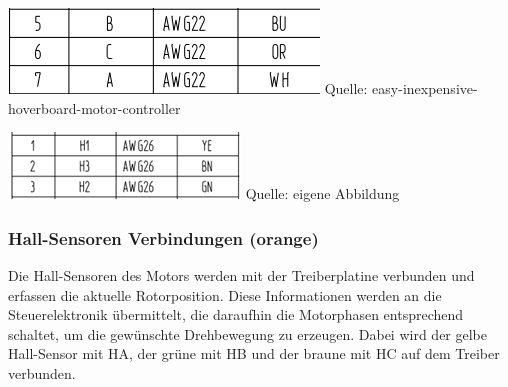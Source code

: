 \documentclass[ngerman,12pt,a4paper]{article}
\begin{document}
			\begin{minipage}{0.48\textwidth} %
				\raggedright
				\includegraphics[scale=0.5]{Pictures/Phasen-motor}
				\label{fig:phasen_motor}
				\vspace{-2pt}
				\small Quelle: easy-inexpensive-hoverboard-motor-controller
			\end{minipage}
			\hfill %
			\begin{minipage}{0.48\textwidth} %
				\raggedright
				\includegraphics[scale=0.5]{Pictures/Hall-Sensoren-Motor}
				\label{fig:phasen_treiber}
				\vspace{-2pt}
				\small Quelle: eigene Abbildung
			\end{minipage}
			
			\subsubsection*{Hall-Sensoren Verbindungen (orange)}
			
			Die Hall-Sensoren des Motors werden mit der Treiberplatine verbunden und erfassen die aktuelle Rotorposition. Diese Informationen werden an die Steuerelektronik übermittelt, die daraufhin die Motorphasen entsprechend schaltet, um die gewünschte Drehbewegung zu erzeugen. Dabei wird der gelbe Hall-Sensor mit HA, der grüne mit HB und der braune mit HC auf dem Treiber verbunden. \\[0.5cm]
			
\end{document}
